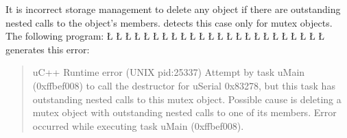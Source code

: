 \documentclass[openright,twoside]{report}
\begin{document}
It is incorrect storage management to delete any object if there are outstanding nested calls to the object's members.
\uC detects this case only for mutex objects.
The following program:
\LGinlinefalse\LGbegin\lgrinde
\L{}
\L{\LB{}}
\L{}
\L{}
\L{\LB{}}
\L{\LB{\};}}
\L{}
\L{\LB{}}
\L{}
\L{\LB{}}
\L{\LB{}}
\CE{}\L{\LB{}}
\CE{}\L{\LB{}}
\L{\LB{}}
\L{\LB{}}
\CE{}\L{\LB{}}
\L{\LB{\};}}
\endlgrinde\LGend
\LGinlinefalse\LGbegin\lgrinde
\L{}
\L{\LB{}}
\CE{}\L{\LB{\}}}
\L{}
\L{\LB{}}
\L{\LB{}}
\L{\LB{\}}}
\endlgrinde\LGend
generates this error:
\begin{quote}
\BGfont
uC++ Runtime error (UNIX pid:25337) Attempt by task uMain (0xffbef008) to call the destructor for uSerial 0x83278, but this task has outstanding nested calls to this mutex object.
Possible cause is deleting a mutex object with outstanding nested calls to one of its members.
Error occurred while executing task uMain (0xffbef008).
\end{quote}
\end{document}
